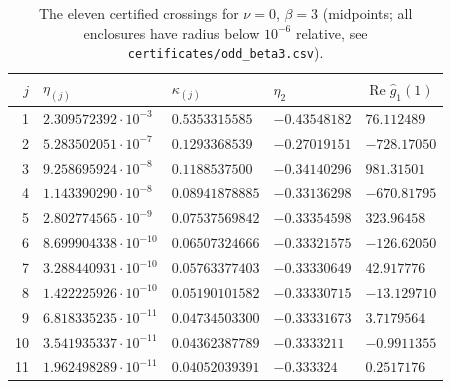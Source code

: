 \documentclass[11pt,a4paper]{report}
\newcommand{\gh}{\hat g}
\begin{document}
\begin{table}[ht]
\centering\small
\begin{tabular}{rllll}
\toprule
$j$ & $\eta_{(j)}$ & $\kappa_{(j)}$ & $\eta_2$ & $\operatorname{Re}\gh_1(1)$\\
\midrule
1 & $2.309572392\cdot10^{-3}$ & $0.5353315585$ & $-0.43548182$ & $76.112489$\\
2 & $5.283502051\cdot10^{-7}$ & $0.1293368539$ & $-0.27019151$ & $-728.17050$\\
3 & $9.258695924\cdot10^{-8}$ & $0.1188537500$ & $-0.34140296$ & $981.31501$\\
4 & $1.143390290\cdot10^{-8}$ & $0.08941878885$ & $-0.33136298$ & $-670.81795$\\
5 & $2.802774565\cdot10^{-9}$ & $0.07537569842$ & $-0.33354598$ & $323.96458$\\
6 & $8.699904338\cdot10^{-10}$ & $0.06507324666$ & $-0.33321575$ & $-126.62050$\\
7 & $3.288440931\cdot10^{-10}$ & $0.05763377403$ & $-0.33330649$ & $42.917776$\\
8 & $1.422225926\cdot10^{-10}$ & $0.05190101582$ & $-0.33330715$ & $-13.129710$\\
9 & $6.818335235\cdot10^{-11}$ & $0.04734503300$ & $-0.33331673$ & $3.7179564$\\
10 & $3.541935337\cdot10^{-11}$ & $0.04362387789$ & $-0.3333211$ & $-0.9911355$\\
11 & $1.962498289\cdot10^{-11}$ & $0.04052039391$ & $-0.333324$ & $0.2517176$\\
\bottomrule
\end{tabular}
\caption{The eleven certified crossings for $\nu=0$, $\beta=3$ (midpoints; all enclosures have radius below $10^{-6}$ relative, see \texttt{certificates/odd\_beta3.csv}).}\label{tab:odd}
\end{table}
\end{document}
